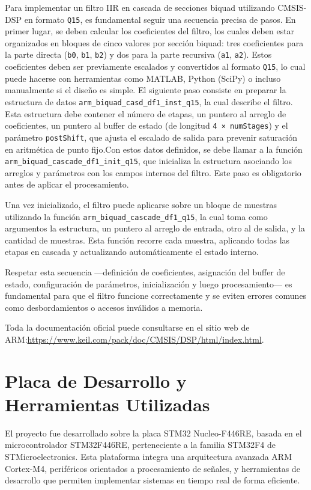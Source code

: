 \documentclass[12pt]{article}
\begin{document}
	Para implementar un filtro IIR en cascada de secciones biquad utilizando CMSIS-DSP en formato \texttt{Q15}, es fundamental seguir una secuencia precisa de pasos. En primer lugar, se deben calcular los coeficientes del filtro, los cuales deben estar organizados en bloques de cinco valores por sección biquad: tres coeficientes para la parte directa (\texttt{b0}, \texttt{b1}, \texttt{b2}) y dos para la parte recursiva (\texttt{a1}, \texttt{a2}). Estos coeficientes deben ser previamente escalados y convertidos al formato \texttt{Q15}, lo cual puede hacerse con herramientas como MATLAB, Python (SciPy) o incluso manualmente si el diseño es simple. El siguiente paso consiste en preparar la estructura de datos \texttt{arm\_biquad\_casd\_df1\_inst\_q15}, la cual describe el filtro. Esta estructura debe contener el número de etapas, un puntero al arreglo de coeficientes, un puntero al buffer de estado (de longitud \texttt{4 × numStages}) y el parámetro \texttt{postShift}, que ajusta el escalado de salida para prevenir saturación en aritmética de punto fijo.Con estos datos definidos, se debe llamar a la función \texttt{arm\_biquad\_cascade\_df1\_init\_q15}, que inicializa la estructura asociando los arreglos y parámetros con los campos internos del filtro. Este paso es obligatorio antes de aplicar el procesamiento.
	
	Una vez inicializado, el filtro puede aplicarse sobre un bloque de muestras utilizando la función \texttt{arm\_biquad\_cascade\_df1\_q15}, la cual toma como argumentos la estructura, un puntero al arreglo de entrada, otro al de salida, y la cantidad de muestras. Esta función recorre cada muestra, aplicando todas las etapas en cascada y actualizando automáticamente el estado interno.
	
	Respetar esta secuencia —definición de coeficientes, asignación del buffer de estado, configuración de parámetros, inicialización y luego procesamiento— es fundamental para que el filtro funcione correctamente y se eviten errores comunes como desbordamientos o accesos inválidos a memoria.
	
	Toda la documentación oficial puede consultarse en el sitio web de ARM:\newline \href{https://www.keil.com/pack/doc/CMSIS/DSP/html/index.html}{https://www.keil.com/pack/doc/CMSIS/DSP/html/index.html}.
	
    \newpage
	
	\section{Placa de Desarrollo y Herramientas Utilizadas}
	El proyecto fue desarrollado sobre la placa STM32 Nucleo-F446RE, basada en el microcontrolador STM32F446RE, perteneciente a la familia STM32F4 de STMicroelectronics. Esta plataforma integra una arquitectura avanzada ARM Cortex-M4, periféricos orientados a procesamiento de señales, y herramientas de desarrollo que permiten implementar sistemas en tiempo real de forma eficiente.
	
\end{document}
